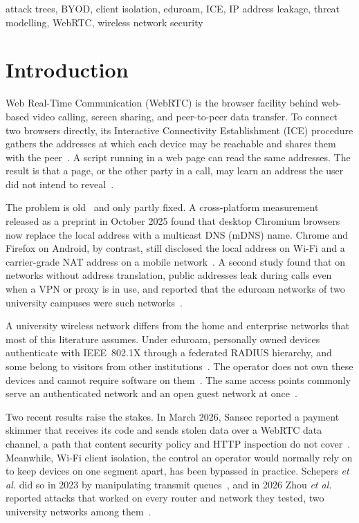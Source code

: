\documentclass[conference]{IEEEtran}
\begin{document}
\begin{IEEEkeywords}
attack trees, BYOD, client isolation, eduroam, ICE, IP address leakage, threat modelling, WebRTC, wireless network security
\end{IEEEkeywords}

\section{Introduction}
Web Real-Time Communication (WebRTC) is the browser facility behind web-based video calling, screen sharing, and peer-to-peer data transfer. To connect two browsers directly, its Interactive Connectivity Establishment (ICE) procedure gathers the addresses at which each device may be reachable and shares them with the peer~\cite{rfc8445}. A script running in a web page can read the same addresses. The result is that a page, or the other party in a call, may learn an address the user did not intend to reveal~\cite{rfc8828,rfc8826}.

The problem is old~\cite{alfannah2017,fakis2020} and only partly fixed. A cross-platform measurement released as a preprint in October 2025 found that desktop Chromium browsers now replace the local address with a multicast DNS (mDNS) name. Chrome and Firefox on Android, by contrast, still disclosed the local address on Wi-Fi and a carrier-grade NAT address on a mobile network~\cite{koysha2025}. A second study found that on networks without address translation, public addresses leak during calls even when a VPN or proxy is in use, and reported that the eduroam networks of two university campuses were such networks~\cite{nibert2025}.

A university wireless network differs from the home and enterprise networks that most of this literature assumes. Under eduroam, personally owned devices authenticate with IEEE~802.1X through a federated RADIUS hierarchy, and some belong to visitors from other institutions~\cite{rfc7593}. The operator does not own these devices and cannot require software on them~\cite{cox2017}. The same access points commonly serve an authenticated network and an open guest network at once~\cite{airsnitch2026}.

Two recent results raise the stakes. In March 2026, Sansec reported a payment skimmer that receives its code and sends stolen data over a WebRTC data channel, a path that content security policy and HTTP inspection do not cover~\cite{sansec2026}. Meanwhile, Wi-Fi client isolation, the control an operator would normally rely on to keep devices on one segment apart, has been bypassed in practice. Schepers \emph{et al.} did so in 2023 by manipulating transmit queues~\cite{framingframes2023,macstealer}, and in 2026 Zhou \emph{et al.} reported attacks that worked on every router and network they tested, two university networks among them~\cite{airsnitch2026}.
\end{document}
